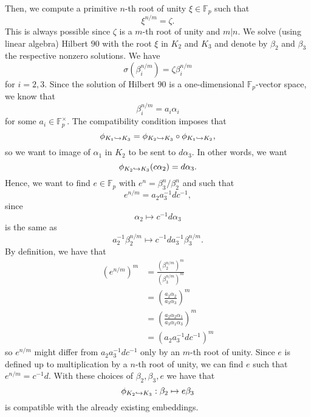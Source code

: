\documentclass[a4paper,11pt]{article}
\begin{document}
Then, we compute a primitive $n$-th root of unity $\xi\in\mathbb{F}_p$ such that
\[
  \xi^{n/m}=\zeta.
\]
This is always possible since $\zeta$ is a $m$-th root of unity and $m|n$.
We solve (using linear algebra) Hilbert $90$ with the root
$\xi$ in $K_2$ and $K_3$ and denote by $\beta_2$ and $\beta_3$ the respective
nonzero solutions. We have
\[
  \sigma(\beta_i^{n/m})=\zeta\beta_i^{n/m}
\] for $i=2,3$. Since the solution of Hilbert $90$ is a one-dimensional
$\mathbb{F}_p$-vector space, we know that
\[
  \beta_i^{n/m}=a_i\alpha_i
\] for some $a_i\in\mathbb{F}_p^\times$. The compatibility condition imposes that 
\[
  \phi_{K_1\hookrightarrow K_3}=\phi_{K_2\hookrightarrow K_3}\circ\phi_{K_1\hookrightarrow K_2},
\]
so we want to image of $\alpha_1$ in $K_2$ to be sent to $d\alpha_3$. In other
words, we want
\[
  \phi_{K_2\hookrightarrow K_3}(c\alpha_2) = d\alpha_3.
\]
Hence, we want to find $e\in\mathbb{F}_p$ with $e^n=\beta_3^n/\beta_2^n$
and such that
\[
  e^{n/m}=a_2a_3^{-1}dc^{-1},
\]
since 
\[
  \alpha_2\mapsto c^{-1}d\alpha_3
\]
is the same as
\[
  a_2^{-1}\beta_2^{n/m}\mapsto c^{-1}da_3^{-1}\beta_3^{n/m}.
\]
By definition, we have that 
\begin{align*}
  (e^{n/m})^m &= \frac{(\beta_2^{n/m})^m}{(\beta_3^{n/m})^m}\\
  &= \left(\frac{a_2\alpha_2}{a_3\alpha_3}\right)^m\\
  &= \left(\frac{a_2\alpha_2\alpha_1}{a_3\alpha_1\alpha_3}\right)^m\\
  &= \left( a_2a_3^{-1}dc^{-1} \right)^m
\end{align*}
so $e^{n/m}$ might differ from $a_2a_3^{-1}dc^{-1}$ only by an $m$-th root of unity. Since $e$ is defined
up to multiplication by a $n$-th root of unity, we can find $e$ such that
$e^{n/m}=c^{-1}d$. With these choices of $\beta_2, \beta_3, e$ we have that 
\[
  \phi_{K_2\hookrightarrow K_3}:\beta_2\mapsto e\beta_3
\]
is compatible with the already existing embeddings.
\end{document}
